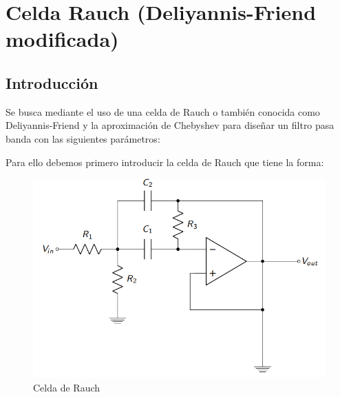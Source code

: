 \section{Celda Rauch (Deliyannis-Friend modificada)}

\subsection{Introducción}

Se busca mediante el uso de una celda de Rauch o también conocida como Deliyannis-Friend y la aproximación de Chebyshev para diseñar un filtro pasa banda con las siguientes parámetros:

\begin{table}[H]
    \centering
    \caption{Par\'ametros de diseño para el filtro a implementar}
    \label{ej22diseno}
\end{table}

Para ello debemos primero introducir la celda de Rauch que tiene la forma:

\begin{figure}[H]
    \centering
    \includegraphics[scale = 0.6]{circuito3.png}
    \caption{Celda de Rauch}
    \label{ej22cirbasic}
\end{figure}


